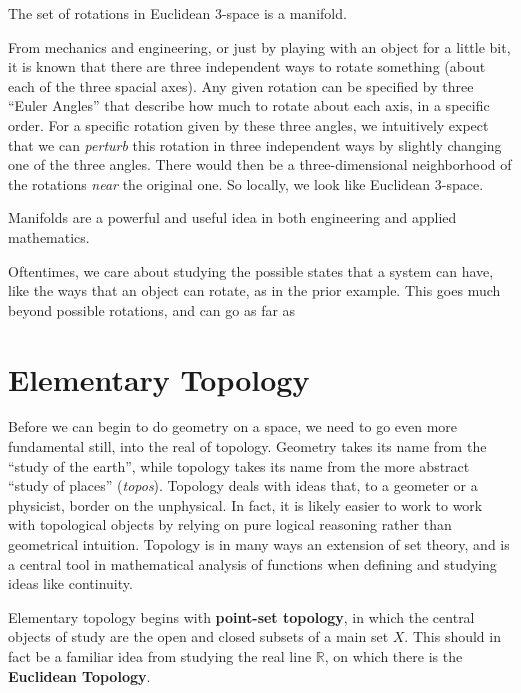 \documentclass[../master.tex]{subfiles}
\begin{document}
	\begin{example}\label{ex:SO_n}
		The set of rotations in Euclidean $3$-space is a manifold. 
	\end{example}
	From mechanics and engineering, or just by playing with an object for a little bit, it is known that there are three independent ways to rotate something (about each of the three spacial axes). Any given rotation can be specified by three ``Euler Angles'' that describe how much to rotate about each axis, in a specific order. For a specific rotation given by these three angles, we intuitively expect that we can \emph{perturb} this rotation in three independent ways by slightly changing one of the three angles. There would then be a three-dimensional neighborhood of the rotations \emph{near} the original one. So locally, we look like Euclidean 3-space. 
	
	\begin{prop}
		Manifolds are a powerful and useful idea in both engineering and applied mathematics.
	\end{prop}
	Oftentimes, we care about studying the possible states that a system can have, like the ways that an object can rotate, as in the prior example. This goes much beyond possible rotations, and can go as far as 
	
	
	
	
	\section{Elementary Topology} %
	\label{sec:elementary_topology}
	
	
	Before we can begin to do geometry on a space, we need to go even more fundamental still, into the real of topology. Geometry takes its name from the ``study of the earth'', while topology takes its name from the more abstract ``study of places'' (\emph{topos}). Topology deals with ideas that, to a geometer or a physicist, border on the unphysical. In fact, it is likely easier to work to work with topological objects by relying on pure logical reasoning rather than geometrical intuition. Topology is in many ways an extension of set theory, and is a central tool in mathematical analysis of functions when defining and studying ideas like continuity.
	
	Elementary topology begins with \textbf{point-set topology}, in which the central objects of study are the open and closed subsets of a main set $X$. This should in fact be a familiar idea from studying the real line $\mathbb{R}$, on which there is the \textbf{Euclidean Topology}.
	
\end{document}
